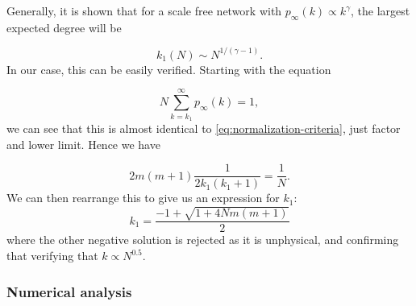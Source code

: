 Generally, it is shown \citep{Boguna2004} that for a scale free network with $p_{\infty}(k) \propto k^{\gamma}$, the largest expected degree will be

\begin{equation}
	k_1(N) \sim N^{1 / (\gamma -1)}.
	\label{eq:largest-expected-degree-research}
\end{equation}
In our case, this can be easily verified. Starting with the equation 

\begin{equation}
	N \sum_{k=k_1}^\infty p_{\infty}(k) = 1, 
	\label{eq:largest-expected-degree-criteria}
\end{equation}
we can see that this is almost identical to \autoref{eq:normalization-criteria}, just factor and lower limit. Hence we have 

\begin{equation}
	2m(m+1) \frac{1}{2k_1(k_1+1)} = \frac{1}{N}.
	\label{eq:largest-expected-degree-derivation}
\end{equation}
We can then rearrange this to give us an expression for $k_1$:
\begin{equation}
	k_1 = \frac{-1 + \sqrt{1 + 4Nm(m+1)}}{2}
	\label{eq:k1-expression}
\end{equation}
where the other negative solution is rejected as it is unphysical, and confirming that verifying that $k \propto N^{0.5}$. 

\subsubsection{Numerical analysis}\label{subsection:pa-numerical-largest-degree}
